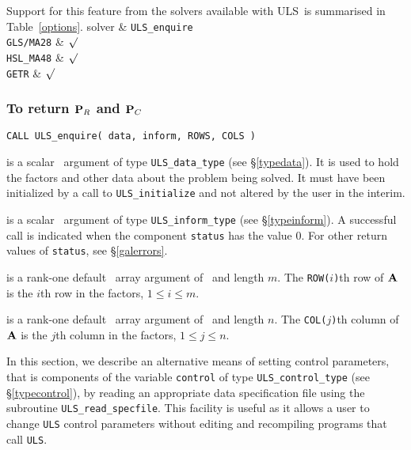 \documentclass{galahad}
\newcommand{\packagename}{ULS}
\begin{document}
\newpage
Support for this feature from the solvers available with \packagename\
is summarised in Table~\ref{options}.
\hline
 solver & {\tt \packagename\_enquire} \\
\hline
{\tt GLS/MA28}  & $\surd$  \\
{\tt HSL\_MA48} & $\surd$  \\
{\tt GETR} & $\surd$  \\
\hline
{}
\vspace*{-8mm}
\subsubsection{To return ${\mathbf{P}}_R$ and ${\mathbf{P}}_C$}
\label{galenquire}

\hskip0.5in
{\tt CALL \packagename\_enquire( data, inform, ROWS, COLS )}

\begin{description}

 is a scalar \intentinout\ argument of type
{\tt \packagename\_data\_type}
(see \S\ref{typedata}). It is used to hold the factors and other
data about the problem being solved.
It must have been initialized by a call to
{\tt \packagename\_ini\-tialize} and not altered by the user in the interim.

 is a scalar \intentinout\ argument of type
{\tt \packagename\_inform\_type}
(see \S\ref{typeinform}).
A successful call is indicated when the  component {\tt status} has the value 0.
For other return values of {\tt status}, see \S\ref{galerrors}.

 is a rank-one default \integer\ array argument
of \intentout\  and length $m$. The {\tt ROW($i$)}th row of ${\mathbf{A}}$
is the $i$th row in the factors, $1 \leq i \leq m$.

 is a rank-one default \integer\ array argument
of \intentout\  and length $n$. The {\tt COL($j$)}th column of ${\mathbf{A}}$
is the $j$th column in the factors, $1 \leq j \leq n$.
\end{description}


\galcontrolfeatures
\noindent In this section, we describe an alternative means of setting
control parameters, that is components of the variable {\tt control} of type
{\tt \packagename\_control\_type}
(see \S\ref{typecontrol}),
by reading an appropriate data specification file using the
subroutine {\tt \packagename\_read\_specfile}. This facility
is useful as it allows a user to change  {\tt \packagename} control parameters
without editing and recompiling programs that call {\tt \packagename}.
\end{document}
